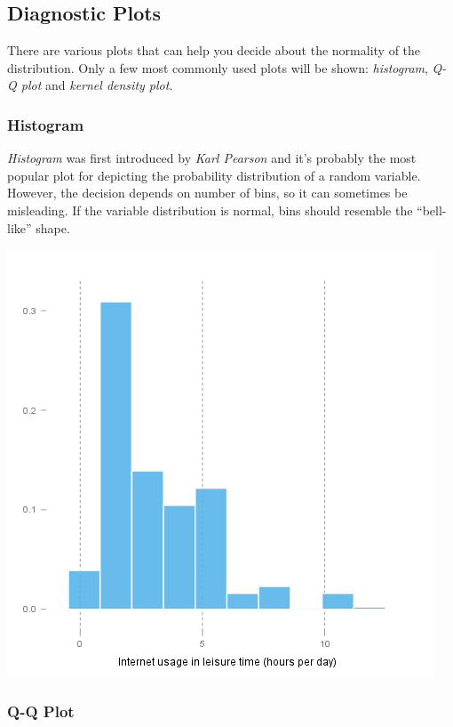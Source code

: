 \documentclass[]{article}
\makeatletter
\def\maxwidth{\ifdim\Gin@nat@width>\linewidth\linewidth
\else\Gin@nat@width\fi}
\let\Oldincludegraphics\includegraphics
\renewcommand{\includegraphics}[1]{\Oldincludegraphics[width=\maxwidth]{#1}}
\makeatother
\begin{document}
\subsection{Diagnostic Plots}

There are various plots that can help you decide about the normality of
the distribution. Only a few most commonly used plots will be shown:
\emph{histogram}, \emph{Q-Q plot} and \emph{kernel density plot}.

\subsubsection{Histogram}

\emph{Histogram} was first introduced by \emph{Karl Pearson} and it's
probably the most popular plot for depicting the probability
distribution of a random variable. However, the decision depends on
number of bins, so it can sometimes be misleading. If the variable
distribution is normal, bins should resemble the ``bell-like'' shape.

\href{a949c4cf7eda15cd079e9d63b81acdd4-hires.png}{\includegraphics{a949c4cf7eda15cd079e9d63b81acdd4.png}}

\subsubsection{Q-Q Plot}
\end{document}
